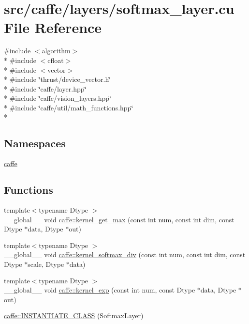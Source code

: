 \hypertarget{softmax__layer_8cu}{\section{src/caffe/layers/softmax\+\_\+layer.cu File Reference}
\label{softmax__layer_8cu}
}
{\ttfamily \#include $<$algorithm$>$}\\*
{\ttfamily \#include $<$cfloat$>$}\\*
{\ttfamily \#include $<$vector$>$}\\*
{\ttfamily \#include \char`\"{}thrust/device\+\_\+vector.\+h\char`\"{}}\\*
{\ttfamily \#include \char`\"{}caffe/layer.\+hpp\char`\"{}}\\*
{\ttfamily \#include \char`\"{}caffe/vision\+\_\+layers.\+hpp\char`\"{}}\\*
{\ttfamily \#include \char`\"{}caffe/util/math\+\_\+functions.\+hpp\char`\"{}}\\*
\subsection*{Namespaces}
\begin{DoxyCompactItemize}
\item 
 \hyperlink{namespacecaffe}{caffe}
\end{DoxyCompactItemize}
\subsection*{Functions}
\begin{DoxyCompactItemize}
\item 
{\footnotesize template$<$typename Dtype $>$ }\\\+\_\+\+\_\+global\+\_\+\+\_\+ void \hyperlink{namespacecaffe_ada77c3264b07ddfc2c1753c7331b8b09}{caffe\+::kernel\+\_\+get\+\_\+max} (const int num, const int dim, const Dtype $\ast$data, Dtype $\ast$out)
\item 
{\footnotesize template$<$typename Dtype $>$ }\\\+\_\+\+\_\+global\+\_\+\+\_\+ void \hyperlink{namespacecaffe_a11ed3b27ece2c308c54197b97026736b}{caffe\+::kernel\+\_\+softmax\+\_\+div} (const int num, const int dim, const Dtype $\ast$scale, Dtype $\ast$data)
\item 
{\footnotesize template$<$typename Dtype $>$ }\\\+\_\+\+\_\+global\+\_\+\+\_\+ void \hyperlink{namespacecaffe_a77d45a889e472a1bd13458be8b5f8201}{caffe\+::kernel\+\_\+exp} (const int num, const Dtype $\ast$data, Dtype $\ast$out)
\item 
\hyperlink{namespacecaffe_a6fa6fe4a2398b265fe5ca12997afbb38}{caffe\+::\+I\+N\+S\+T\+A\+N\+T\+I\+A\+T\+E\+\_\+\+C\+L\+A\+S\+S} (Softmax\+Layer)
\end{DoxyCompactItemize}
